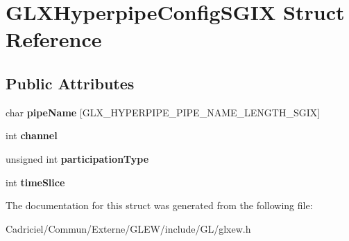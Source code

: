 \hypertarget{struct_g_l_x_hyperpipe_config_s_g_i_x}{}\section{G\+L\+X\+Hyperpipe\+Config\+S\+G\+IX Struct Reference}
\label{struct_g_l_x_hyperpipe_config_s_g_i_x}
\subsection*{Public Attributes}
\begin{DoxyCompactItemize}
\item 
char {\bfseries pipe\+Name} \mbox{[}G\+L\+X\+\_\+\+H\+Y\+P\+E\+R\+P\+I\+P\+E\+\_\+\+P\+I\+P\+E\+\_\+\+N\+A\+M\+E\+\_\+\+L\+E\+N\+G\+T\+H\+\_\+\+S\+G\+IX\mbox{]}\hypertarget{struct_g_l_x_hyperpipe_config_s_g_i_x_a9e3748f92005cac81cb44d4c67acccb8}{}\label{struct_g_l_x_hyperpipe_config_s_g_i_x_a9e3748f92005cac81cb44d4c67acccb8}

\item 
int {\bfseries channel}\hypertarget{struct_g_l_x_hyperpipe_config_s_g_i_x_abc812d8796ba89d5de4e33b3532d8335}{}\label{struct_g_l_x_hyperpipe_config_s_g_i_x_abc812d8796ba89d5de4e33b3532d8335}

\item 
unsigned int {\bfseries participation\+Type}\hypertarget{struct_g_l_x_hyperpipe_config_s_g_i_x_a093cfaaec305531f66e1120929b5b01b}{}\label{struct_g_l_x_hyperpipe_config_s_g_i_x_a093cfaaec305531f66e1120929b5b01b}

\item 
int {\bfseries time\+Slice}\hypertarget{struct_g_l_x_hyperpipe_config_s_g_i_x_afe9288e75dc1ae5e0f33eff978d7024d}{}\label{struct_g_l_x_hyperpipe_config_s_g_i_x_afe9288e75dc1ae5e0f33eff978d7024d}

\end{DoxyCompactItemize}


The documentation for this struct was generated from the following file\+:\begin{DoxyCompactItemize}
\item 
Cadriciel/\+Commun/\+Externe/\+G\+L\+E\+W/include/\+G\+L/glxew.\+h\end{DoxyCompactItemize}
